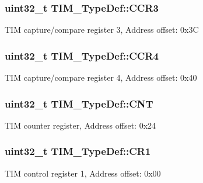 \subsubsection[{\texorpdfstring{C\+C\+R3}{CCR3}}]{ uint32\+\_\+t T\+I\+M\+\_\+\+Type\+Def\+::\+C\+C\+R3}\hypertarget{struct_t_i_m___type_def_ac83441bfb8d0287080dcbd945a272a74}{}\label{struct_t_i_m___type_def_ac83441bfb8d0287080dcbd945a272a74}
T\+IM capture/compare register 3, Address offset\+: 0x3C 
\subsubsection[{\texorpdfstring{C\+C\+R4}{CCR4}}]{ uint32\+\_\+t T\+I\+M\+\_\+\+Type\+Def\+::\+C\+C\+R4}\hypertarget{struct_t_i_m___type_def_a5ba381c3f312fdf5e0b4119641b3b0aa}{}\label{struct_t_i_m___type_def_a5ba381c3f312fdf5e0b4119641b3b0aa}
T\+IM capture/compare register 4, Address offset\+: 0x40 
\subsubsection[{\texorpdfstring{C\+NT}{CNT}}]{ uint32\+\_\+t T\+I\+M\+\_\+\+Type\+Def\+::\+C\+NT}\hypertarget{struct_t_i_m___type_def_a6fdd2a7fb88d28670b472aaac0d9d262}{}\label{struct_t_i_m___type_def_a6fdd2a7fb88d28670b472aaac0d9d262}
T\+IM counter register, Address offset\+: 0x24 
\subsubsection[{\texorpdfstring{C\+R1}{CR1}}]{ uint32\+\_\+t T\+I\+M\+\_\+\+Type\+Def\+::\+C\+R1}\hypertarget{struct_t_i_m___type_def_a9dafc8b03e8497203a8bb395db865328}{}\label{struct_t_i_m___type_def_a9dafc8b03e8497203a8bb395db865328}
T\+IM control register 1, Address offset\+: 0x00 
